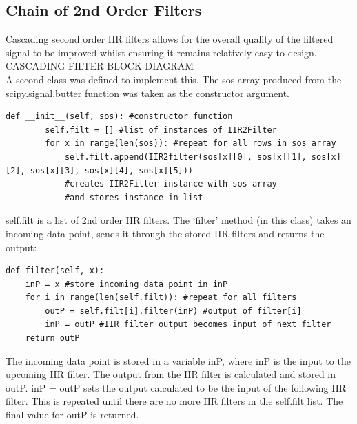 \documentclass{article}
\begin{document}
\subsection{Chain of 2nd Order Filters}
Cascading second order IIR filters allows for the overall quality of the filtered signal to be improved whilst ensuring it remains relatively easy to design.
\\CASCADING FILTER BLOCK DIAGRAM\\
A second class was defined to implement this.\newline
The sos array produced from the scipy.signal.butter function was taken as the constructor argument.
\begin{lstlisting}
def __init__(self, sos): #constructor function
        self.filt = [] #list of instances of IIR2Filter
        for x in range(len(sos)): #repeat for all rows in sos array
            self.filt.append(IIR2filter(sos[x][0], sos[x][1], sos[x][2], sos[x][3], sos[x][4], sos[x][5]))
            #creates IIR2Filter instance with sos array
            #and stores instance in list
\end{lstlisting}
self.filt is a list of 2nd order IIR filters. The `filter' method (in this class) takes an incoming data point, sends it through the stored IIR filters and returns the output:
\begin{lstlisting}
def filter(self, x): 
    inP = x #store incoming data point in inP
    for i in range(len(self.filt)): #repeat for all filters
        outP = self.filt[i].filter(inP) #output of filter[i]
        inP = outP #IIR filter output becomes input of next filter
    return outP
\end{lstlisting}
The incoming data point is stored in a variable inP, where inP is the input to the upcoming IIR filter. The output from the IIR filter is calculated and stored in outP. inP = outP sets the output calculated to be the input of the following IIR filter. This is repeated until there are no more IIR filters in the self.filt list. The final value for outP is returned.
\end{document}
